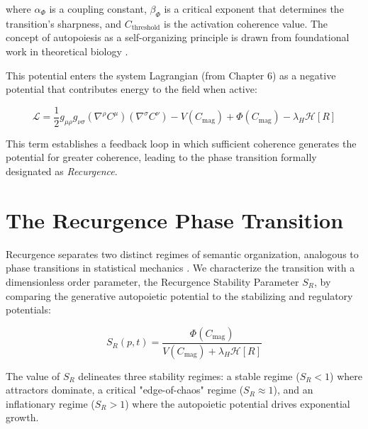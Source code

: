 where \(\alpha_{\Phi}\) is a coupling constant, \(\beta_{\Phi}\) is a critical exponent that determines the transition's sharpness, and \(C_{\text{threshold}}\) is the activation coherence value. The concept of autopoiesis as a self-organizing principle is drawn from foundational work in theoretical biology \autocite{MaturanaVarela1980}.

This potential enters the system Lagrangian (from Chapter 6) as a negative potential that contributes energy to the field when active:

\begin{equation}
\mathcal{L} = \frac{1}{2} g_{\mu\rho} g_{\nu\sigma} (\nabla^\rho C^\mu)(\nabla^\sigma C^\nu) - V(C_{\mathrm{mag}}) + \Phi(C_{\mathrm{mag}}) - \lambda_H \mathcal{H}[R]
\end{equation}

This term establishes a feedback loop in which sufficient coherence generates the potential for greater coherence, leading to the phase transition formally designated as \textit{Recurgence}.


\section{The Recurgence Phase Transition}
\label{7.3:the_recurgence_phase_transition}

Recurgence separates two distinct regimes of semantic organization, analogous to phase transitions in statistical mechanics \autocite{Landau1937, Stanley1971, Goldenfeld1992}. We characterize the transition with a dimensionless order parameter, the Recurgence Stability Parameter \(S_R\), by comparing the generative autopoietic potential to the stabilizing and regulatory potentials:

\begin{equation}
S_R(p,t) = \frac{\Phi(C_{\mathrm{mag}})}{V(C_{\mathrm{mag}}) + \lambda_H \mathcal{H}[R]}
\end{equation}

The value of \(S_R\) delineates three stability regimes: a stable regime (\(S_R < 1\)) where attractors dominate, a critical "edge-of-chaos" regime (\(S_R \approx 1\)), and an inflationary regime (\(S_R > 1\)) where the autopoietic potential drives exponential growth.


